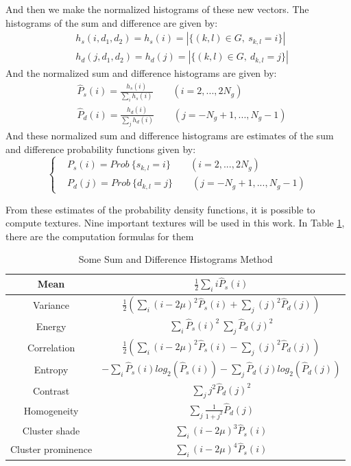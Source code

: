 And then we make the normalized histograms of these new vectors. The histograms of the sum and difference are given by:
\begin{equation}
\begin{split}
&h_s(i, d_1, d_2) = h_s(i) = |\{(k,l) \in G, \ s_{k,l} = i\}|\\
&h_d(j, d_1, d_2) = h_d(j) = |\{(k,l) \in G, \ d_{k,l} = j\}|
\end{split}
\end{equation}
And the normalized sum and difference histograms are given by:
\begin{equation}
\begin{split}
&\hat{P}_s(i) = \frac{h_s(i)}{\sum_i h_s(i)} \qquad (i=2,...,2N_g)\\
&\hat{P}_d(i) = \frac{h_d(i)}{\sum_j h_d(i)} \qquad (j=-N_g+1, ... ,N_g-1)
\end{split}
\end{equation}
And these normalized sum and difference histograms are estimates of the sum and difference probability functions given by:
\begin{equation}
\begin{cases}
&P_s(i) = Prob\  \{s_{k,l} = i\} \qquad (i=2,...,2N_g)\\
&P_d(j) = Prob\  \{d_{k,l} = j\} \qquad (j=-N_g+1, ... ,N_g-1)
\end{cases}
\end{equation}

From these estimates of the probability density functions, it is possible to compute textures. Nine important textures will be used in this work. In Table \ref{table:sum_and_diff_calculations}, there are the computation formulas for them

\begin{table}[H]
\centering
\begin{tabular}{ |c |c |}
 \hline Mean & $\frac{1}{2}\sum_i i\hat{P}_s(i)$\\ 
 \hline Variance & $\frac{1}{2}(\sum_i (i-2\mu)^2\hat{P}_s(i) + \sum_j (j)^2\hat{P}_d(j))$\\
 \hline Energy & $\sum_i \hat{P}_s(i)^2 \ \sum_j \hat{P}_d(j)^2$\\
 \hline Correlation & $\frac{1}{2}(\sum_i (i-2\mu)^2\hat{P}_s(i) - \sum_j (j)^2\hat{P}_d(j))$\\
 \hline Entropy & $-\sum_i\hat{P}_s(i)log_2(\hat{P}_s(i)) - \sum_j\hat{P}_d(j)log_2(\hat{P}_d(j))$\\
 \hline Contrast & $\sum_j j^2 \hat{P}_d(j)^2$\\
 \hline Homogeneity & $\sum_j\frac{1}{1+j^2} \hat{P}_d(j)$\\
 \hline Cluster shade & $\sum_i (i-2\mu)^3 \hat{P}_s(i)$\\
 \hline Cluster prominence & $\sum_i (i-2\mu)^4 \hat{P}_s(i)$\\
 \hline
\end{tabular}
\caption{Some Sum and Difference Histograms Method}
\label{table:sum_and_diff_calculations}
\end{table}


